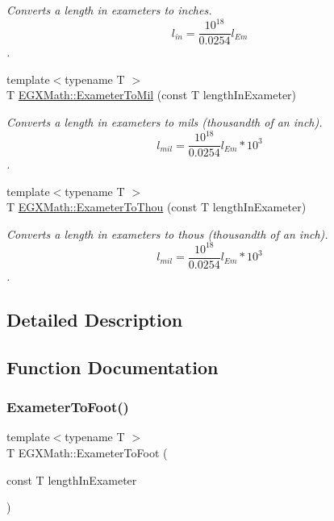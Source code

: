 \begin{DoxyCompactItemize}
\begin{DoxyCompactList}\small\item\em Converts a length in exameters to inches. \[ l_{in}= \frac{10^{18}}{0.0254} l_{Em} \]. \end{DoxyCompactList}\item 
{\footnotesize template$<$typename T $>$ }\\T \mbox{\hyperlink{group___e_g_x_math-_conversions-_length_conversions-_exameter-_imperial_ga863f9f7f7e2826324fec642027c48614}{E\+G\+X\+Math\+::\+Exameter\+To\+Mil}} (const T length\+In\+Exameter)
\begin{DoxyCompactList}\small\item\em Converts a length in exameters to mils (thousandth of an inch). \[ l_{mil}= \frac{10^{18}}{0.0254} l_{Em} * 10^{3} \]. \end{DoxyCompactList}\item 
{\footnotesize template$<$typename T $>$ }\\T \mbox{\hyperlink{group___e_g_x_math-_conversions-_length_conversions-_exameter-_imperial_gafee1930a425fcae4f9a3d8631aa62b05}{E\+G\+X\+Math\+::\+Exameter\+To\+Thou}} (const T length\+In\+Exameter)
\begin{DoxyCompactList}\small\item\em Converts a length in exameters to thous (thousandth of an inch). \[ l_{mil}= \frac{10^{18}}{0.0254} l_{Em} * 10^{3} \]. \end{DoxyCompactList}\end{DoxyCompactItemize}


\subsection{Detailed Description}


\subsection{Function Documentation}
\mbox{\label{group___e_g_x_math-_conversions-_length_conversions-_exameter-_imperial_gac6057a24ad10c84b86ec52c9a37f916b}} 
\subsubsection{\texorpdfstring{Exameter\+To\+Foot()}{ExameterToFoot()}}
{\footnotesize\ttfamily template$<$typename T $>$ \\
T E\+G\+X\+Math\+::\+Exameter\+To\+Foot (\begin{DoxyParamCaption}\item[{const T}]{length\+In\+Exameter }\end{DoxyParamCaption})}



